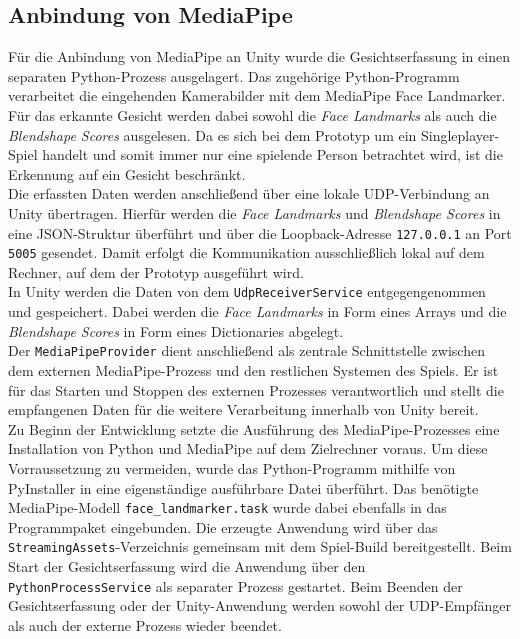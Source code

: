\documentclass[intern]{cgMA}
\begin{document}
\subsection{Anbindung von MediaPipe}
Für die Anbindung von MediaPipe an Unity wurde die Gesichtserfassung in
einen separaten Python-Prozess ausgelagert. Das zugehörige Python-Programm
verarbeitet die eingehenden Kamerabilder mit dem MediaPipe Face Landmarker.
Für das erkannte Gesicht werden dabei sowohl die \textit{Face Landmarks}
als auch die \textit{Blendshape Scores} ausgelesen. Da es sich bei dem
Prototyp um ein Singleplayer-Spiel handelt und somit immer nur eine
spielende Person betrachtet wird, ist die Erkennung auf ein Gesicht
beschränkt.\\
Die erfassten Daten werden anschließend über eine lokale UDP-Verbindung
an Unity übertragen. Hierfür werden die \textit{Face Landmarks} und
\textit{Blendshape Scores} in eine JSON-Struktur überführt und über die
Loopback-Adresse \texttt{127.0.0.1} an Port \texttt{5005} gesendet.
Damit erfolgt die Kommunikation ausschließlich lokal auf dem Rechner,
auf dem der Prototyp ausgeführt wird.\\
In Unity werden die Daten von dem \texttt{UdpReceiverService}
entgegengenommen und gespeichert. Dabei werden die \textit{Face Landmarks}
in Form eines Arrays und die \textit{Blendshape Scores} in Form eines
Dictionaries abgelegt.\\
Der \texttt{MediaPipeProvider} dient anschließend als zentrale
Schnittstelle zwischen dem externen MediaPipe-Prozess und den restlichen
Systemen des Spiels. Er ist für das Starten und Stoppen des externen
Prozesses verantwortlich und stellt die empfangenen Daten für die weitere
Verarbeitung innerhalb von Unity bereit.\\
Zu Beginn der Entwicklung setzte die Ausführung des MediaPipe-Prozesses eine Installation von Python und MediaPipe auf dem Zielrechner voraus. Um diese Vorraussetzung zu vermeiden, wurde das Python-Programm mithilfe von PyInstaller in eine eigenständige ausführbare Datei überführt. Das benötigte MediaPipe-Modell
\texttt{face\_landmarker.task} wurde dabei ebenfalls in das Programmpaket
eingebunden. Die erzeugte Anwendung wird über das
\texttt{StreamingAssets}-Verzeichnis gemeinsam mit dem Spiel-Build
bereitgestellt.
Beim Start der
Gesichtserfassung wird die Anwendung über den
\texttt{PythonProcessService} als separater Prozess gestartet. Beim
Beenden der Gesichtserfassung oder der Unity-Anwendung werden sowohl
der UDP-Empfänger als auch der externe Prozess wieder beendet.
\end{document}
